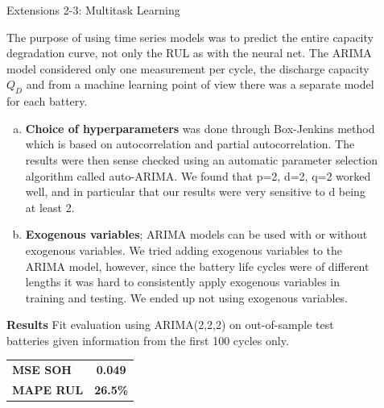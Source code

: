 \documentclass[final]{beamer}
\newlength{\sepwidth}
\newlength{\colwidth}
\newcommand{\separatorcolumn}{\begin{column}{\sepwidth}\end{column}}
\begin{document}
\begin{frame}[t]
\begin{columns}[t]
\begin{column}{\colwidth}
\end{column}

\separatorcolumn

\begin{column}{\colwidth}

  \begin{block}{Extensions 2-3: Multitask Learning}

    The purpose of using time series models was to predict the entire capacity degradation curve, not only the RUL as with the neural net. The ARIMA model considered only one measurement per cycle, the discharge capacity $Q_D$ and from a machine learning point of view there was a separate model for each battery. 
    
    \begin{enumerate}[(a)]%
      \item \textbf{Choice of hyperparameters} was done through Box-Jenkins method which is based on autocorrelation and partial autocorrelation. The results were then sense checked using an automatic parameter selection algorithm called auto-ARIMA. We found that p=2, d=2, q=2 worked well, and in particular that our results were very sensitive to d being at least 2.
      
      \item \textbf{Exogenous variables}; ARIMA models can be used with or without exogenous variables. We tried adding exogenous variables to the ARIMA model, however, since the battery life cycles were of different lengths it was hard to consistently apply exogenous variables in training and testing. We ended up not using exogenous variables. 
    \end{enumerate}

    \begin{minipage}[t]{0.65\textwidth}
    \textbf{Results} Fit evaluation using ARIMA(2,2,2) on out-of-sample test batteries given information from the first 100 cycles only.    
    \end{minipage}
    \begin{minipage}[t]{0.30\textwidth}
    \begin{flushright}
    \begin{tabular}{ l c }
       \textbf{MSE SOH} &  \textbf{0.049} \\
       \textbf{MAPE RUL} &  \textbf{26.5\%}
    \end{tabular}
    \end{flushright}
    \end{minipage}
      

\end{block}
\end{column}
\end{columns}
\end{frame}
\end{document}
